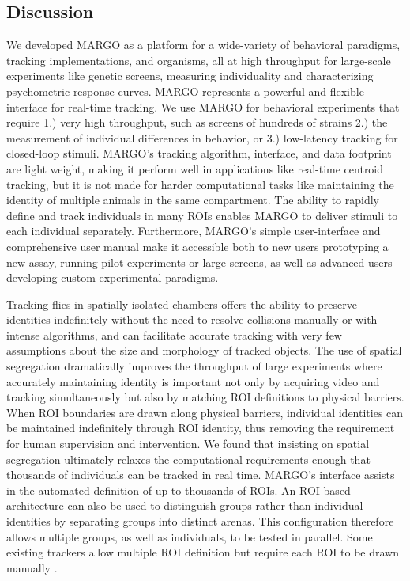 \documentclass[10pt]{article}
\begin{document}
\begin{multicols}{2}
\section*{Discussion}

We developed MARGO as a platform for a wide-variety of behavioral paradigms, tracking implementations, and organisms, all at high throughput for large-scale experiments like genetic screens, measuring individuality and characterizing psychometric response curves. MARGO represents a powerful and flexible interface for real-time tracking. We use MARGO for behavioral experiments that require 1.) very high throughput, such as screens of hundreds of strains 2.) the measurement of individual differences in behavior, or 3.) low-latency tracking for closed-loop stimuli. MARGO's tracking algorithm, interface, and data footprint are light weight, making it perform well in applications like real-time centroid tracking, but it is not made for harder computational tasks like maintaining the identity of multiple animals in the same compartment. The ability to rapidly define and track individuals in many ROIs enables MARGO to deliver stimuli to each individual separately. Furthermore, MARGO's simple user-interface and comprehensive user manual make it accessible both to new users prototyping a new assay, running pilot experiments or large screens, as well as advanced users developing custom experimental paradigms.

Tracking flies in spatially isolated chambers offers the ability to preserve identities indefinitely without the need to resolve collisions manually or with intense algorithms, and can facilitate accurate tracking with very few assumptions about the size and morphology of tracked objects. The use of spatial segregation dramatically improves the throughput of large experiments where accurately maintaining identity is important not only by acquiring video and tracking simultaneously but also by matching ROI definitions to physical barriers. When ROI boundaries are drawn along physical barriers, individual identities can be maintained indefinitely through ROI identity, thus removing the requirement for human supervision and intervention. We found that insisting on spatial segregation ultimately relaxes the computational requirements enough that thousands of individuals can be tracked in real time. MARGO's interface assists in the automated definition of up to thousands of ROIs. An ROI-based architecture can also be used to distinguish groups rather than individual identities by separating groups into distinct arenas. This configuration therefore allows multiple groups, as well as individuals, to be tested in parallel. Some existing trackers allow multiple ROI definition but require each ROI to be drawn manually \cite{Prez-Escudero_idTracker_2014,Mnck_BioTracker_2018}.


\end{multicols}
\end{document}
